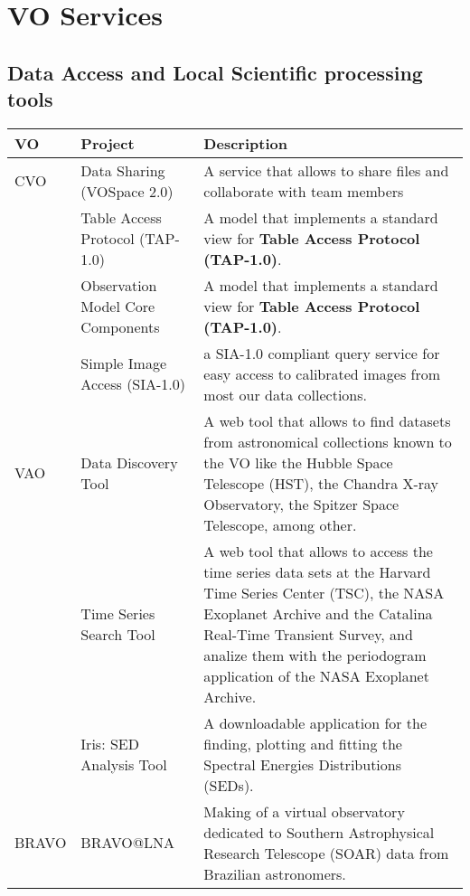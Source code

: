 \section{VO Services}
\subsection{Data Access and Local Scientific processing tools}
\begin{table*}[h!t]
	\centering
	\begin{tabular}{|l|l|p{12.5cm}|}
	\hline
	\textbf{VO} 		& \textbf{Project} & \textbf{Description} \\
	\hline
	CVO 	& Data Sharing (VOSpace 2.0) &  A service that allows to share files and collaborate with team members \\
			& Table Access Protocol (TAP-1.0) &	A model that implements a standard view for \textbf{Table Access Protocol (TAP-1.0)}. \\
			& Observation Model Core Components & A model that implements a standard view for \textbf{Table Access Protocol (TAP-1.0)}. \\
			& Simple Image Access (SIA-1.0) & a SIA-1.0 compliant query service for easy access to calibrated images from most our data collections. \\
	\hline
	VAO		& Data Discovery Tool & A web tool that allows to find datasets from astronomical collections known to the VO like the Hubble Space Telescope 
									(HST), the Chandra X-ray Observatory, the Spitzer Space Telescope, among other.\\
			& Time Series Search Tool & A web tool that allows to access the time series data sets at the Harvard Time Series Center (TSC), the NASA 
									Exoplanet Archive and the Catalina Real-Time Transient Survey, and analize them with the periodogram application 
									of the NASA Exoplanet Archive.\\
			& Iris: SED Analysis Tool & A downloadable application for the finding, plotting and fitting the 
			Spectral Energies Distributions (SEDs). \\
	\hline
	BRAVO	& BRAVO@LNA & Making of a virtual observatory dedicated to Southern Astrophysical Research Telescope (SOAR) data from Brazilian astronomers.  \\

\end{tabular}
\end{table*}
